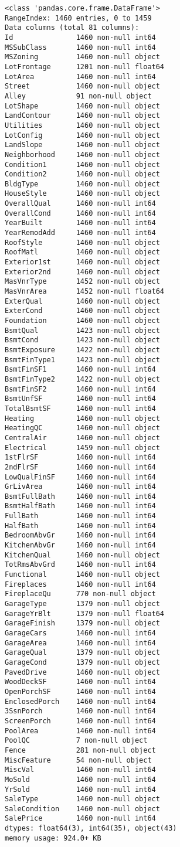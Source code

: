 \documentclass[11pt]{article}
\begin{document}
    \begin{Verbatim}[commandchars=\\\{\}]
<class 'pandas.core.frame.DataFrame'>
RangeIndex: 1460 entries, 0 to 1459
Data columns (total 81 columns):
Id               1460 non-null int64
MSSubClass       1460 non-null int64
MSZoning         1460 non-null object
LotFrontage      1201 non-null float64
LotArea          1460 non-null int64
Street           1460 non-null object
Alley            91 non-null object
LotShape         1460 non-null object
LandContour      1460 non-null object
Utilities        1460 non-null object
LotConfig        1460 non-null object
LandSlope        1460 non-null object
Neighborhood     1460 non-null object
Condition1       1460 non-null object
Condition2       1460 non-null object
BldgType         1460 non-null object
HouseStyle       1460 non-null object
OverallQual      1460 non-null int64
OverallCond      1460 non-null int64
YearBuilt        1460 non-null int64
YearRemodAdd     1460 non-null int64
RoofStyle        1460 non-null object
RoofMatl         1460 non-null object
Exterior1st      1460 non-null object
Exterior2nd      1460 non-null object
MasVnrType       1452 non-null object
MasVnrArea       1452 non-null float64
ExterQual        1460 non-null object
ExterCond        1460 non-null object
Foundation       1460 non-null object
BsmtQual         1423 non-null object
BsmtCond         1423 non-null object
BsmtExposure     1422 non-null object
BsmtFinType1     1423 non-null object
BsmtFinSF1       1460 non-null int64
BsmtFinType2     1422 non-null object
BsmtFinSF2       1460 non-null int64
BsmtUnfSF        1460 non-null int64
TotalBsmtSF      1460 non-null int64
Heating          1460 non-null object
HeatingQC        1460 non-null object
CentralAir       1460 non-null object
Electrical       1459 non-null object
1stFlrSF         1460 non-null int64
2ndFlrSF         1460 non-null int64
LowQualFinSF     1460 non-null int64
GrLivArea        1460 non-null int64
BsmtFullBath     1460 non-null int64
BsmtHalfBath     1460 non-null int64
FullBath         1460 non-null int64
HalfBath         1460 non-null int64
BedroomAbvGr     1460 non-null int64
KitchenAbvGr     1460 non-null int64
KitchenQual      1460 non-null object
TotRmsAbvGrd     1460 non-null int64
Functional       1460 non-null object
Fireplaces       1460 non-null int64
FireplaceQu      770 non-null object
GarageType       1379 non-null object
GarageYrBlt      1379 non-null float64
GarageFinish     1379 non-null object
GarageCars       1460 non-null int64
GarageArea       1460 non-null int64
GarageQual       1379 non-null object
GarageCond       1379 non-null object
PavedDrive       1460 non-null object
WoodDeckSF       1460 non-null int64
OpenPorchSF      1460 non-null int64
EnclosedPorch    1460 non-null int64
3SsnPorch        1460 non-null int64
ScreenPorch      1460 non-null int64
PoolArea         1460 non-null int64
PoolQC           7 non-null object
Fence            281 non-null object
MiscFeature      54 non-null object
MiscVal          1460 non-null int64
MoSold           1460 non-null int64
YrSold           1460 non-null int64
SaleType         1460 non-null object
SaleCondition    1460 non-null object
SalePrice        1460 non-null int64
dtypes: float64(3), int64(35), object(43)
memory usage: 924.0+ KB


\end{Verbatim}
\end{document}
